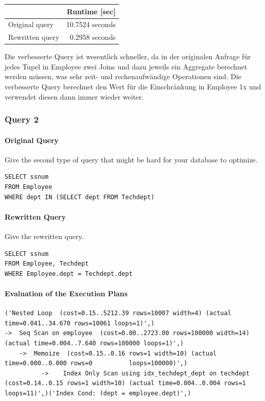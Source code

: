 \documentclass[11pt]{scrartcl}
\begin{document}
\begin{table}[H]
  \centering
  \begin{tabular}{l|r}
    & Runtime [sec] \tabularnewline
    \hline
    Original query & 10.7524 seconds \tabularnewline
    Rewritten query & 0.2958 seconds \tabularnewline
  \end{tabular}
\end{table}

Die verbesserte Query ist wesentlich schneller, da in der originalen Anfrage für jedes Tupel in Employee zwei Joins und dazu jeweils ein Aggregate berechnet werden müssen, was sehr zeit- und rechenaufwändige Operationen sind. Die verbesserte Query berechnet den Wert für die Einschränkung in Employee 1x und verwendet diesen dann immer wieder weiter.

\subsubsection*{Query 2}

\paragraph{Original Query}

Give the second type of query that might be hard for your database to optimize.

\begin{lstlisting}[style=dbtsql]
SELECT ssnum
FROM Employee
WHERE dept IN (SELECT dept FROM Techdept)
\end{lstlisting}

\paragraph{Rewritten Query}

Give the rewritten query.

\begin{lstlisting}[style=dbtsql]
SELECT ssnum
FROM Employee, Techdept
WHERE Employee.dept = Techdept.dept
\end{lstlisting}

\paragraph{Evaluation of the Execution Plans}

{\small
\parskip0pt\begin{verbatim}
('Nested Loop  (cost=0.15..5212.39 rows=10007 width=4) (actual time=0.041..34.670 rows=10061 loops=1)',)
->  Seq Scan on employee  (cost=0.00..2723.00 rows=100000 width=14) (actual time=0.004..7.640 rows=100000 loops=1)',)
	->  Memoize  (cost=0.15..0.16 rows=1 width=10) (actual time=0.000..0.000 rows=0 	     loops=100000)',)
		  ->  	Index Only Scan using idx_techdept_dept on techdept  					(cost=0.14..0.15 rows=1 width=10) (actual time=0.004..0.004 rows=1 			loops=11)',)('Index Cond: (dept = employee.dept)',)
\end{verbatim}}
\end{document}
